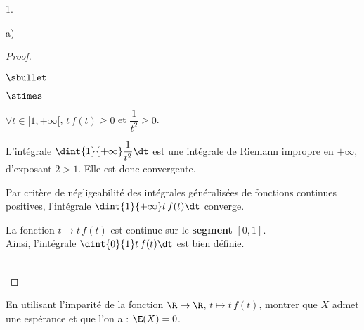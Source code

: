\documentclass[11pt]{article}%
\begin{document}
\begin{noliste}{1.}
\begin{noliste}{a)}
\begin{proof}
\begin{noliste}{$\sbullet$}
\begin{noliste}{$\stimes$}
  \item $\forall t\in[1,+\infty[$, $t\, f(t) \geq 0$ \quad et \quad
    $\dfrac{1}{t^2}\geq 0$.
  \item L'intégrale $\dint{1}{+\infty} \dfrac{1}{t^2}\dt$ est une
    intégrale de Riemann impropre en $+\infty$, d'exposant $2>1$.
    Elle est donc convergente.
  \end{noliste}
  Par critère de négligeabilité des intégrales généralisées de 
  fonctions continues positives, l'intégrale $\dint{1}{+\infty} t\, 
  f(t)\dt$ converge.
  

  
  
  
\item La fonction $t\mapsto t\, f(t)$ est continue sur le {\bf
    segment} $[0,1]$.\\
  Ainsi, l'intégrale $\dint{0}{1} t\, f(t)\dt$ est bien définie.
 \end{noliste}
 
 ~\\[-1.4cm]
\end{proof}

\item En utilisant l'imparité de la fonction $\R\to \R$, $t\mapsto t
  \, f(t)$, montrer que $X$ admet une espérance et que l'on a :
  $\E(X)=0$.


\end{noliste}
\end{noliste}
\end{document}
